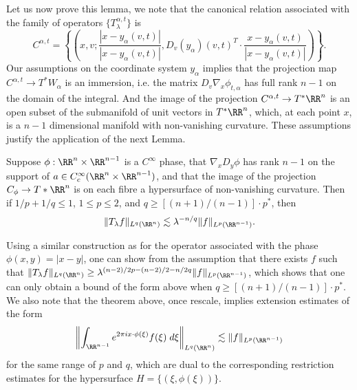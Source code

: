 %
Let us now prove this lemma, we note that the canonical relation associated with the family of operators $ \{ T^{\alpha,t}_\lambda \}$ is
%
\[ C^{\alpha,t} = \left\{ \left( x,v; \frac{|x - y_\alpha(v,t)|}{|x - y_\alpha(v,t)|}, D_v(y_\alpha)(v,t)^T \cdot \frac{x - y_\alpha(v,t)}{|x - y_\alpha(v,t)|} \right) \right\}. \]
%
Our assumptions on the coordinate system $y_\alpha$ implies that the projection map $C^{\alpha,t} \to T^* W_\alpha$ is an immersion, i.e. the matrix $D_v \nabla_x \phi_{t,\alpha}$ has full rank $n-1$ on the domain of the integral. And the image of the projection $C^{\alpha,t} \to T^* \RR^n$ is an open subset of the submanifold of unit vectors in $T^* \RR^n$, which, at each point $x$, is a $n-1$ dimensional manifold with non-vanishing curvature. These assumptions justify the application of the next Lemma.

\begin{lemma}
    Suppose $\phi: \RR^n \times \RR^{n-1}$ is a $C^\infty$ phase, that $\nabla_x D_y \phi$ has rank $n-1$ on the support of $a \in C_c^\infty(\RR^n \times \RR^{n-1})$, and that the image of the projection $C_\phi \to T* \RR^n$ is on each fibre a hypersurface of non-vanishing curvature. Then if $1/p + 1/q \leq 1$, $1 \leq p \leq 2$, and $q \geq [(n+1)/(n-1)] \cdot p^*$, then
    \[ \| T_\lambda f \|_{L^q(\RR^n)} \lesssim \lambda^{-n/q} \| f \|_{L^p(\RR^{n-1})}. \]
\end{lemma}

\begin{remark}
    Using a similar construction as for the operator associated with the phase $\phi(x,y) = |x - y|$, one can show from the assumption that there exists $f$ such that $\| T_\lambda f \|_{L^q(\RR^n)} \geq \lambda^{(n-2)/2p - (n-2)/2 - n/2q} \| f \|_{L^p(\RR^{n-1})}$, which shows that one can only obtain a bound of the form above when $q \geq [(n+1)/(n-1)] \cdot p^*$. We also note that the theorem above, once rescale, implies extension estimates of the form
    \[ \left\| \int_{\RR^{n-1}} e^{2 \pi i x \cdot \phi(\xi)} f(\xi)\; d\xi \right\|_{L^q(\RR^n)} \lesssim \| f \|_{L^p(\RR^{n-1})} \]
    for the same range of $p$ and $q$, which are dual to the corresponding restriction estimates for the hypersurface $H = \{ (\xi,\phi(\xi)) \}$.
\end{remark}

